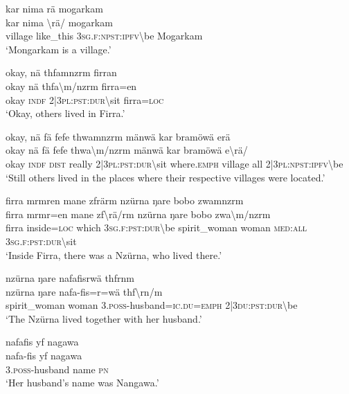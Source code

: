 \ea\label{ex:7:a4665}
kar nima rä mogarkam\\
\gll kar	nima	{\textbackslash}rä/	mogarkam\\
     village	like\_this	3\textsc{sg}.\textsc{f}:\textsc{npst}:\textsc{ipfv}{\textbackslash}be	Mogarkam\\
\glt `Mongarkam is a village.'
\z

\ea\label{ex:7:a4667}
okay, nä thfamnzrm firran\\
\gll okay	nä	thfa{\textbackslash}m/nzrm	firra=en\\
     okay	\textsc{indf}	2|3\textsc{pl}:\textsc{pst}:\textsc{dur}{\textbackslash}sit	firra=\textsc{loc}\\
\glt `Okay, others lived in Firra.'
\z

\ea\label{ex:7:a4668}
okay, nä fä fefe thwamnzrm mänwä kar bramöwä erä\\
\gll okay	nä	fä	fefe	thwa{\textbackslash}m/nzrm	mänwä	kar	bramöwä	e{\textbackslash}rä/\\
     okay	\textsc{indf}	\textsc{dist}	really	2|3\textsc{pl}:\textsc{pst}:\textsc{dur}{\textbackslash}sit	where.\textsc{emph}	village	all	2|3\textsc{pl}:\textsc{npst}:\textsc{ipfv}{\textbackslash}be\\
\glt `Still others lived in the places where their respective villages were located.'
\z

\ea\label{ex:7:a4669}
firra mrmren mane zfrärm nzürna ŋare bobo zwamnzrm\\
\gll firra	mrmr=en	mane	zf{\textbackslash}rä/rm	nzürna	ŋare	bobo	zwa{\textbackslash}m/nzrm\\
     firra	inside=\textsc{loc}	which	3\textsc{sg}.\textsc{f}:\textsc{pst}:\textsc{dur}{\textbackslash}be	spirit\_woman	woman	\textsc{med}:\textsc{all}	3\textsc{sg}.\textsc{f}:\textsc{pst}:\textsc{dur}{\textbackslash}sit\\
\glt `Inside Firra, there was a Nzürna, who lived there.'
\z

\ea\label{ex:7:a4672}
nzürna ŋare nafafisrwä thfrnm\\
\gll nzürna	ŋare	nafa-fis=r=wä	thf{\textbackslash}rn/m\\
     spirit\_woman	woman	3.\textsc{poss}-husband=\textsc{ic}.\textsc{du}=\textsc{emph}	2|3\textsc{du}:\textsc{pst}:\textsc{dur}{\textbackslash}be\\
\glt `The Nzürna lived together with her husband.'
\z

\ea\label{ex:7:a4673}
nafafis yf nagawa\\
\gll nafa-fis	yf	nagawa\\
     3.\textsc{poss}-husband	name	\textsc{pn}\\
\glt `Her husband's name was Nangawa.'
\z

